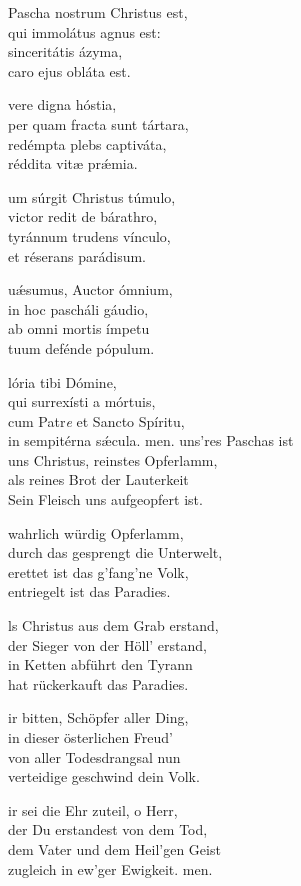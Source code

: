 \documentclass[fontsize=10pt,paper=A5,twoside,BCOR=1mm,DIV=21,headinclude]{scrarticle}
\begin{document}
\begin{paracol}{2}\pcb
\begin{hymnus}
 Pascha nostrum Christus est,\\
\hspace{1.6em} qui immolátus agnus est:\\
sinceritátis ázyma,\\
caro ejus obláta est.

 vere digna hóstia,\\
per quam fracta sunt tártara,\\
redémpta plebs captiváta,\\
réddita vitæ prǽmia.

um súrgit Christus túmulo,\\
victor redit de bárathro,\\
tyránnum trudens vínculo,\\
et réserans parádisum.

uǽsumus, Auctor ómnium,\\
in hoc pascháli gáudio,\\
ab omni mortis ímpetu\\
tuum defénde pópulum.

lória tibi Dómine,\\
qui surrexísti a mórtuis,\\
cum Patr\textit{e} et Sancto Spíritu,\\
in sempitérna sǽcula.
men.
	\switchcolumn
	 uns'res Paschas ist\\
	\hspace{1.6em} uns Christus, reinstes Opferlamm,\\
	als reines Brot der Lauterkeit\\
	Sein Fleisch uns aufgeopfert ist.

	 wahrlich würdig Opferlamm,\\
	durch das gesprengt die Unterwelt,\\
	erettet ist das g'fang'ne Volk,\\
	entriegelt ist das Paradies.

	ls Christus aus dem Grab erstand,\\
	der Sieger von der Höll' erstand,\\
	in Ketten abführt den Tyrann\\
	hat rückerkauft das Paradies.

	ir bitten, Schöpfer aller Ding,\\
	in dieser österlichen Freud'\\
	von aller Todesdrangsal nun\\
	verteidige geschwind dein Volk.

	ir sei die Ehr zuteil, o Herr,\\
	der Du erstandest von dem Tod,\\
	dem Vater und dem Heil'gen Geist\\
	zugleich in ew'ger Ewigkeit. men.
\end{hymnus}
\end{paracol}
\end{document}
